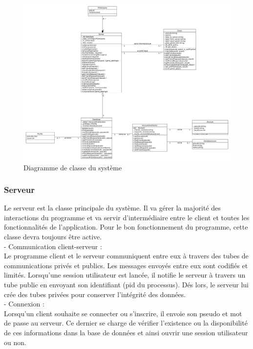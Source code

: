 \documentclass[a4paper,12pt]{article}
\begin{document}
\begin{figure}[h!]
\centering
\includegraphics[width=16cm]{images/newSystemClassDiagram.png}
\caption{Diagramme de classe du système}
\label{fig:UerUseCase}
\end{figure}

\subsubsection{Serveur}
Le serveur est la classe principale du système. Il va gérer la majorité des interactions du programme et va servir d'intermédiaire entre le client et toutes les fonctionnalités de l'application. Pour le bon fonctionnement du programme, cette classe devra toujours être active.\\

- Communication client-serveur : \\
Le programme client et le serveur communiquent entre eux à travers des tubes de communications privés et publics. Les messages envoyés entre eux sont codifiés et limités.
Lorsqu'une session utilisateur est lancée, il notifie le serveur à travers un tube public en envoyant son identifiant (pid du processus). 
Dés lors, le serveur lui crée des tubes privées pour conserver l'intégrité des données.\\

- Connexion : \\
Lorsqu'un client souhaite se connecter ou s'inscrire, il envoie son pseudo et mot de passe au serveur. Ce dernier se charge de vérifier l'existence ou la disponibilité de ces informations dans la base de données et ainsi ouvrir une session utilisateur ou non. 
\end{document}
